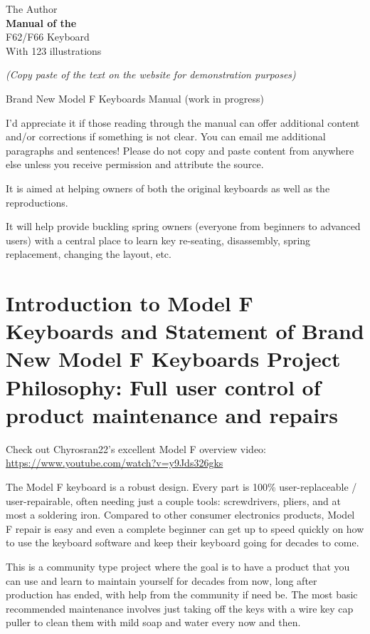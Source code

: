 \documentclass[a5paper, twoside]{memoir}
\newcommand*{\plogo}{\fbox{$\mathcal{PL}$}}
\newcommand*{\titleTH}{\begingroup %
\raggedleft
\vspace*{\baselineskip}
{\Large The Author}\\[0.167\textheight]
{\bfseries Manual of the}\\[\baselineskip]
{{\Huge F62/F66 Keyboard}}\\[\baselineskip]
{\small With 123 illustrations}\par
\vfill
\vspace*{3\baselineskip}
\endgroup}
\begin{document}
\thispagestyle{empty}
\afterpage{\restorepagecolor}
\color{white}
\titleTH
\cleardoublepage
\color{black}

\frontmatter
\tableofcontents*
\clearpage
\listoffigures*
\clearpage
\listoftables*

\mainmatter

\emph{(Copy paste of the text on the website for demonstration purposes)}

Brand New Model F Keyboards Manual (work in progress)

I’d appreciate it if those reading through the manual can offer additional content and/or corrections if something is not clear.   You can email me additional paragraphs and sentences!  Please do not copy and paste content from anywhere else unless you receive permission and attribute the source.

It is aimed at helping owners of both the original keyboards as well as the reproductions.

It will help provide buckling spring owners (everyone from beginners to advanced users) with a central place to learn key re-seating, disassembly, spring replacement, changing the layout, etc.

\chapter[Introduction to Model F Keyboards]{Introduction to Model F Keyboards and Statement of Brand New Model F Keyboards Project Philosophy: Full user control of product maintenance and repairs}

    Check out Chyrosran22’s excellent Model F overview video:  \url{https://www.youtube.com/watch?v=y9Jds326gks}

    The Model F keyboard is a robust design. Every part is 100\% user-replaceable / user-repairable, often needing just a couple tools: screwdrivers, pliers, and at most a soldering iron. Compared to other consumer electronics products, Model F repair is easy and even a complete beginner can get up to speed quickly on how to use the keyboard software and keep their keyboard going for decades to come.

    This is a community type project where the goal is to have a product that you can use and learn to maintain yourself for decades from now, long after production has ended, with help from the community if need be. The most basic recommended maintenance involves just taking off the keys with a wire key cap puller to clean them with mild soap and water every now and then.
\end{document}

